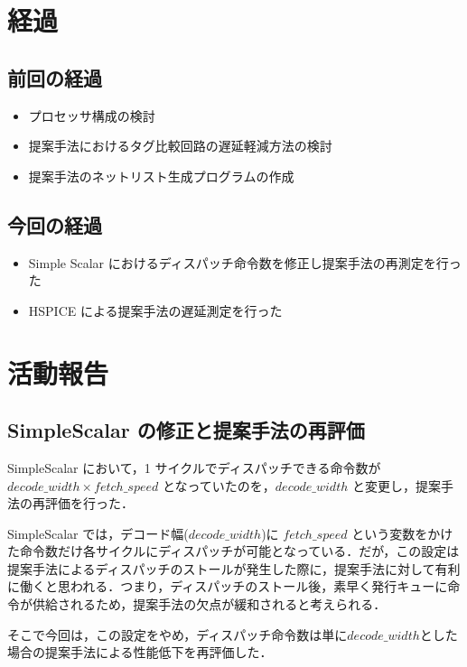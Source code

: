 \documentclass[twocolumn]{jsarticle}
\begin{document}
  \section{経過}

  \subsection{前回の経過}
  \begin{itemize}
    \item プロセッサ構成の検討
    \item 提案手法におけるタグ比較回路の遅延軽減方法の検討
    \item 提案手法のネットリスト生成プログラムの作成
  \end{itemize}
  \subsection{今回の経過}
    \begin{itemize}
      \item Simple Scalar におけるディスパッチ命令数を修正し提案手法の再測定を行った
      \item HSPICE による提案手法の遅延測定を行った
    \end{itemize}
  \section{活動報告}
  \subsection{SimpleScalar の修正と提案手法の再評価}
  SimpleScalar において，1 サイクルでディスパッチできる命令数が $decode\_width \times fetch\_speed$ となっていたのを，$decode\_width$ と変更し，提案手法の再評価を行った．

  SimpleScalar では，デコード幅($decode\_width$)に $fetch\_speed$ という変数をかけた命令数だけ各サイクルにディスパッチが可能となっている．だが，この設定は提案手法によるディスパッチのストールが発生した際に，提案手法に対して有利に働くと思われる．つまり，ディスパッチのストール後，素早く発行キューに命令が供給されるため，提案手法の欠点が緩和されると考えられる．

  そこで今回は，この設定をやめ，ディスパッチ命令数は単に$decode\_width$とした場合の提案手法による性能低下を再評価した．
\end{document}

